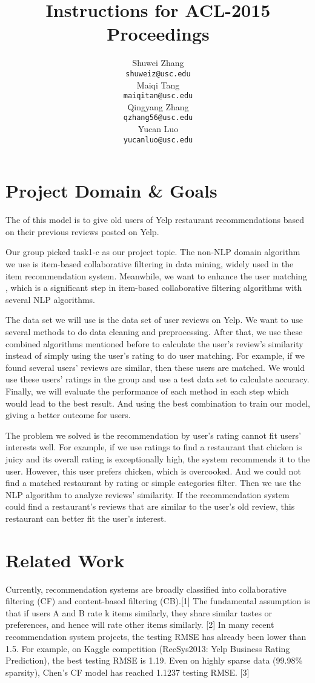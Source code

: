 \documentclass[11pt]{article}
\title{Instructions for ACL-2015 Proceedings}
\author{
  Shuwei Zhang \\
  {\tt shuweiz@usc.edu} \\\And
  Maiqi Tang \\
  {\tt maiqitan@usc.edu} \\\And
  Qingyang Zhang \\
  {\tt qzhang56@usc.edu} \\\And
   Yucan Luo \\
  {\tt yucanluo@usc.edu}
  }
\date{}
\begin{document}
\maketitle

\section{Project Domain \& Goals}
The of this model is to give old users of Yelp restaurant recommendations based on their previous reviews posted on Yelp. 

Our group picked task1-c as our project topic. The non-NLP domain algorithm we use is item-based collaborative filtering in data mining, widely used in the item recommendation system. Meanwhile, we want to enhance the user matching , which is a significant step in item-based collaborative filtering algorithms with several NLP algorithms. 

The data set we will use is the data set of user reviews on Yelp. We want to use several methods to do data cleaning and preprocessing. After that, we use these combined algorithms mentioned before to calculate the user’s review’s similarity instead of simply using the user's rating to do user matching. For example, if we found several users’ reviews are similar, then these users are matched. We would use these users’ ratings in the group and use a test data set to calculate accuracy. Finally, we will evaluate the performance of each method in each step which would lead to the best result. And using the best combination to train our model, giving a better outcome for users.

The problem we solved is the recommendation by user's rating cannot fit users' interests well. For example, if we use ratings to find a restaurant that chicken is juicy and its overall rating is exceptionally high, the system recommends it to the user. However, this user prefers chicken, which is overcooked. And we could not find a matched restaurant by rating or simple categories filter. Then we use the NLP algorithm to analyze reviews' similarity. If the recommendation system could find a restaurant's reviews that are similar to the user's old review, this restaurant can better fit the user's interest.

\section{Related Work}
Currently, recommendation systems are broadly classified into collaborative filtering (CF) and content-based filtering (CB).[1] The fundamental assumption is that if users A and B rate k items similarly, they share similar tastes or preferences, and hence will rate other items similarly. [2] In many recent recommendation system projects, the testing RMSE has already been lower than 1.5. For example, on Kaggle competition (RecSys2013: Yelp Business Rating Prediction), the best testing RMSE is 1.19. Even on highly sparse data (99.98\% sparsity), Chen’s CF model has reached 1.1237 testing RMSE. [3]
\end{document}
